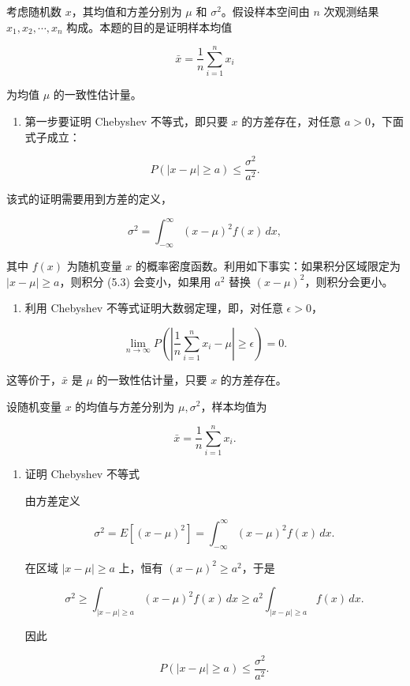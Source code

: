﻿


\begin{question}
考虑随机数 \(x\)，其均值和方差分别为 \(\mu\) 和
\(\sigma^2\)。假设样本空间由 \(n\) 次观测结果 \(x_1,x_2,\cdots,x_n\)
构成。本题的目的是证明样本均值

\[
\bar x=\frac1n\sum_{i=1}^{n}x_i
\]

为均值 \(\mu\) 的一致性估计量。

\begin{enumerate}
\item
  第一步要证明 Chebyshev 不等式，即只要 \(x\) 的方差存在，对任意
  \(a>0\)，下面式子成立：
\end{enumerate}

\[
P(|x-\mu|\ge a)\le \frac{\sigma^2}{a^2}.
\]

该式的证明需要用到方差的定义，

\[
\sigma^2=\int_{-\infty}^{\infty}(x-\mu)^2f(x)\,dx,
\]

其中 \(f(x)\) 为随机变量 \(x\)
的概率密度函数。利用如下事实：如果积分区域限定为
\(|x-\mu|\ge a\)，则积分 (5.3) 会变小，如果用 \(a^2\) 替换
\((x-\mu)^2\)，则积分会更小。

\begin{enumerate}[start=2]
\item
  利用 Chebyshev 不等式证明大数弱定理，即，对任意 \(\epsilon>0\)，
\end{enumerate}

\[
\lim_{n\to\infty}P\left(\left|\frac1n\sum_{i=1}^{n}x_i-\mu\right|\ge\epsilon\right)=0.
\]

这等价于，\(\bar x\) 是 \(\mu\) 的一致性估计量，只要 \(x\) 的方差存在。
\begin{solution}
设随机变量 \(x\) 的均值与方差分别为 \(\mu,\sigma^2\)，样本均值为

\[
\bar x=\frac1n\sum_{i=1}^n x_i.
\]

\begin{enumerate}
\item 证明 Chebyshev 不等式

由方差定义

\[
\sigma^2=E[(x-\mu)^2]=\int_{-\infty}^{\infty}(x-\mu)^2 f(x)\,dx.
\]

在区域 \(|x-\mu|\ge a\) 上，恒有 \((x-\mu)^2\ge a^2\)，于是

\[
\sigma^2 \ge \int_{|x-\mu|\ge a}(x-\mu)^2f(x)\,dx
\ge a^2\int_{|x-\mu|\ge a}f(x)\,dx.
\]

因此

\[
P(|x-\mu|\ge a)\le \frac{\sigma^2}{a^2}.
\]


\end{enumerate}
\end{solution}
\end{question}
